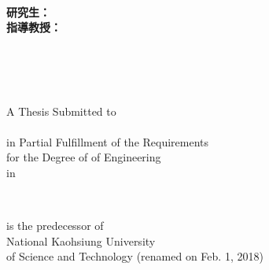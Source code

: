 
\begin{titlepage}
\vspace*{1mm}

\begin{center}

{\LARGE\bfseries  \titletw}\\
\vspace{15mm}
{\LARGE  \titleen}
\vspace{15mm}

{\large\bfseries{研究生：}\large\authortwname\\
\large\bfseries{指導教授：}\large\supervisortwname}

\vspace{15mm}
{\Large\bfseries{\schooltwname}\\
\vspace{4.5mm}
\Large\bfseries{}\\
\vspace{4.5mm}
\Large\bfseries {}}\\
\vspace{10mm}

\vspace{4.5mm}
A Thesis Submitted to \deptenname\\
\schoolenname\\
in Partial Fulfillment of the Requirements\\
for the Degree of \degreeen of Engineering\\
in \majortwname

\vspace{15mm}
\dateen\\
\schoolenlocation

\vspace{10mm}
\schoolenoldname is the predecessor of\\
National Kaohsiung University\\
of Science and Technology (renamed on Feb. 1, 2018)

\vspace{10mm}
\fontsize{14pt}{0pt}{\bfseries{\dateROC }}

\end{center}

\end{titlepage} 